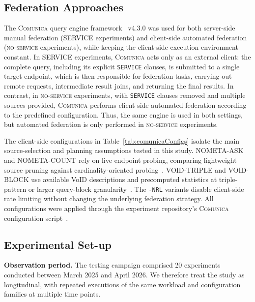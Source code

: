 \documentclass[runningheads]{llncs}
\begin{document}
\subsection{Federation Approaches}\label{sec4.3}
The \textsc{Comunica} query engine framework~\cite{taelman2018comunica} v4.3.0 was used for both server-side manual federation (\textsc{SERVICE} experiments) and client-side automated federation (\textsc{no-service} experiments), while keeping the client-side execution environment constant. 
In \textsc{SERVICE} experiments, \textsc{Comunica} acts only as an external client: the complete query, including its explicit \texttt{SERVICE} clauses, is submitted to a single target endpoint, which is then responsible for federation tasks, carrying out remote requests, intermediate result joins, and returning the final results.
In contrast, in \textsc{no-service} experiments, with \texttt{SERVICE} clauses removed and multiple sources provided, \textsc{Comunica} performs client-side automated federation according to the predefined configuration.
Thus, the same engine is used in both settings, but automated federation is only performed in \textsc{no-service} experiments.



The client-side configurations in Table~\ref{tab:comunicaConfigs} isolate the main source-selection and planning assumptions tested in this study. 
\textsc{NOMETA-ASK} and \textsc{NOMETA-COUNT} rely on live endpoint probing, comparing lightweight source pruning against cardinality-oriented probing~\cite{schwarte2011fedx}. 
\textsc{VOID-TRIPLE} and \textsc{VOID-BLOCK} use available VoID descriptions and precomputed statistics at triple-pattern or larger query-block granularity~\cite{splendid2011,w3cvoid,hagedorn2014resource}. 
The \texttt{-NRL} variants disable client-side rate limiting without changing the underlying federation strategy. 
All configurations were applied through the experiment repository's \textsc{Comunica} configuration script~\cite{fedSparqlSurveyExperimentsRepo}.


\subsection{Experimental Set-up}\label{sec4.4}

\textbf{Observation period.}
The testing campaign comprised 20 experiments conducted between March 2025 and April 2026. 
We therefore treat the study as longitudinal, with repeated executions of the same workload and configuration families at multiple time points.
\end{document}
